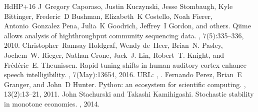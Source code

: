 \begin{sphinxthebibliography}{HdHP+16}
\sphinxAtStartPar
J Gregory Caporaso, Justin Kuczynski, Jesse Stombaugh, Kyle Bittinger, Frederic D Bushman, Elizabeth K Costello, Noah Fierer, Antonio Gonzalez Pena, Julia K Goodrich, Jeffrey I Gordon, and others. Qiime allows analysis of high\sphinxhyphen{}throughput community sequencing data. , 7(5):335–336, 2010.
\sphinxAtStartPar
Christopher Ramsay Holdgraf, Wendy de Heer, Brian N. Pasley, Jochem W. Rieger, Nathan Crone, Jack J. Lin, Robert T. Knight, and Frédéric E. Theunissen. Rapid tuning shifts in human auditory cortex enhance speech intelligibility. , 7(May):13654, 2016. URL: , .
\sphinxAtStartPar
Fernando Perez, Brian E Granger, and John D Hunter. Python: an ecosystem for scientific computing. , 13(2):13–21, 2011.
\sphinxAtStartPar
John Stachurski and Takashi Kamihigashi. Stochastic stability in monotone economies. , 2014.
\end{sphinxthebibliography}



\renewcommand{\indexname}{Index}
\printindex
